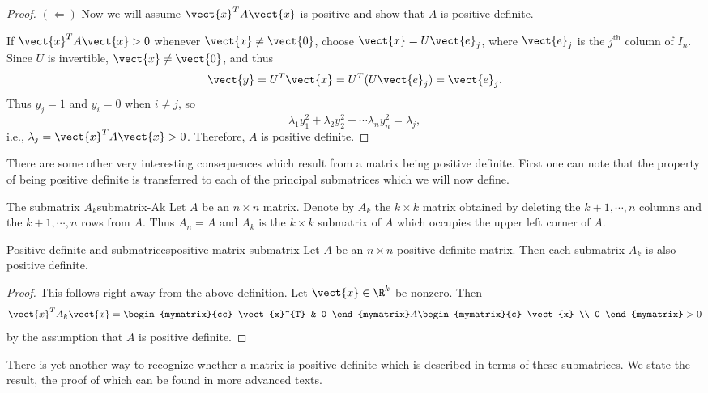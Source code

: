 \begin{proof}
$(\Leftarrow)$ Now we will assume $\vect{x}^T A \vect{x} $ is positive and show that $A$ is positive definite.

If $\vect{x}^TA\vect{x}>0$ whenever $\vect{x}\neq \vect{0}$,
choose $\vect{x}=U\vect{e}_j$, where $\vect{e}_j$ is the $j^{\mbox{th}}$
column of $I_n$.
Since $U$ is invertible, $\vect{x}\neq\vect{0}$, 
and thus
\[ \vect{y}=U^T\vect{x}=U^T(U\vect{e}_j) =\vect{e}_j.\]
Thus $y_j=1$ and $y_i=0$ when $i\neq j$, so
\[ \lambda_1 y_1^2 + \lambda_2 y_2^2 + \cdots \lambda_n y_n^2
=\lambda_j,\]
i.e., $\lambda_j=\vect{x}^TA\vect{x}>0$.
Therefore, $A$ is positive definite.
\end{proof}

There are some other very interesting consequences which result from a
matrix being positive definite. First one can note that the property of
being positive definite is transferred to each of the principal submatrices which we will now define.

\begin{definition}{The submatrix $A_k$}{submatrix-Ak}
Let $A$ be an $n\times n$ matrix. Denote by $A_{k}$ the $k\times k$ matrix
obtained by deleting the $k+1,\cdots ,n$ columns and the $k+1,\cdots ,n$
rows from $A.$ Thus $A_{n}=A$ and $A_{k}$ is the $k\times k$ submatrix of $A$
which occupies the upper left corner of $A.$
\end{definition}

\begin{lemma}{Positive definite and submatrices}{positive-matrix-submatrix}
Let $A$ be an $n\times n$ positive definite matrix.  Then each submatrix $A_{k}$ is also positive definite.
\end{lemma}

\begin{proof}
This follows right away from the above definition. Let $\vect{x}\in \R^{k}$ be nonzero. Then 
\begin{equation*}
\vect{x}^{T}A_{k}\vect{x}=\begin{mymatrix}{cc}
\vect{x}^{T} & 0
\end{mymatrix} A\begin{mymatrix}{c}
\vect{x} \\ 
0
\end{mymatrix} >  0
\end{equation*}
by the assumption that $A$ is positive definite.
\end{proof}

There is yet another way to recognize whether a matrix is positive definite
which is described in terms of these submatrices. We state the result,  the proof
of which can be found in more advanced texts.

